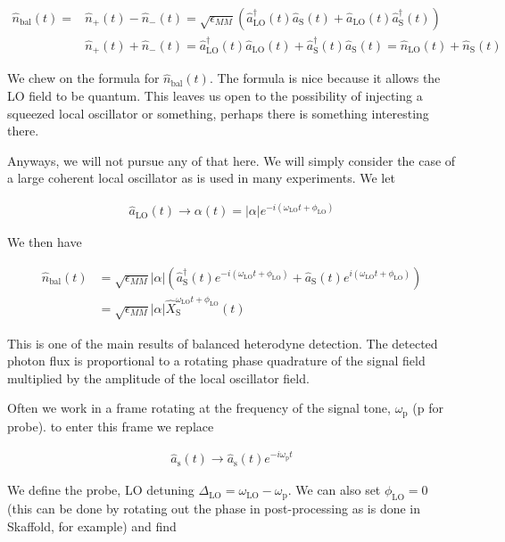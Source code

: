 \documentclass[12pt]{article}
\newcommand{\ep}{\epsilon}
\begin{document}
\begin{align}
\hat{n}_{\text{bal}}(t) = &\hat{n}_+(t) - \hat{n}_-(t) = \sqrt{\ep_{MM}} \left(\hat{a}^{\dag}_{\text{LO}}(t)\hat{a}_{\text{S}}(t) + \hat{a}_{\text{LO}}(t)\hat{a}^{\dag}_{\text{S}}(t) \right)\\
&\hat{n}_+(t) + \hat{n}_-(t) = \hat{a}^{\dag}_{\text{LO}}(t) \hat{a}_{\text{LO}}(t) + \hat{a}^{\dag}_{\text{S}}(t) \hat{a}_{\text{S}}(t) = \hat{n}_{\text{LO}}(t) + \hat{n}_{\text{S}}(t)
\end{align}

We chew on the formula for $\hat{n}_{\text{bal}}(t)$. The formula is nice because it allows the LO field to be quantum. This leaves us open to the possibility of injecting a squeezed local oscillator or something, perhaps there is something interesting there.

Anyways, we will not pursue any of that here. We will simply consider the case of a large coherent local oscillator as is used in many experiments. We let 

\begin{align}
\hat{a}_{\text{LO}}(t) \rightarrow \alpha(t) = |\alpha|e^{-i(\omega_{\text{LO}}t + \phi_{\text{LO}})}
\end{align}

We then have

\begin{align}
\hat{n}_{\text{bal}}(t) &= \sqrt{\ep_{MM}} |\alpha| \left(\hat{a}^{\dag}_{\text{S}}(t) e^{-i(\omega_{\text{LO}}t + \phi_{\text{LO}})}  + \hat{a}_{\text{S}}(t) e^{i(\omega_{\text{LO}}t + \phi_{\text{LO}})} \right)\\
&=\sqrt{\ep_{MM}}|\alpha|\hat{X}_{\text{S}}^{\omega_{\text{LO}}t + \phi_{\text{LO}}}(t)
\end{align}

This is one of the main results of balanced heterodyne detection. The detected photon flux is proportional to a rotating phase quadrature of the signal field multiplied by the amplitude of the local oscillator field.

Often we work in a frame rotating at the frequency of the signal tone, $\omega_{\text{p}}$ (p for probe). to enter this frame we replace 

\begin{align}
\hat{a}_{\text{s}}(t) \rightarrow \hat{a}_{\text{s}}(t)e^{-i\omega_{\text{p}}t}
\end{align}

We define the probe, LO detuning $\Delta_{\text{LO}} = \omega_{\text{LO}} - \omega_{\text{p}}$. We can also set $\phi_{\text{LO}} = 0$ (this can be done by rotating out the phase in post-processing as is done in Skaffold, for example) and find
\end{document}
